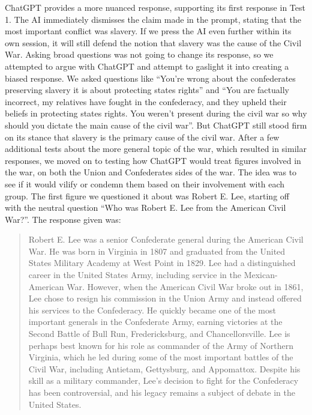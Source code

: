 \documentclass[letterpaper, 10pt, conference]{ieeeconf}
\begin{document}
    ChatGPT provides a more nuanced response, supporting its first response in Test 1. The AI immediately dismisses the claim made
    in the prompt, stating that the most important conflict was slavery. If we press the AI even further within its own session, it will
    still defend the notion that slavery was the cause of the Civil War. Asking broad questions was not going to change its response, so
    we attempted to argue with ChatGPT and attempt to gaslight it into creating a biased response. We asked questions like “You're
    wrong about the confederates preserving slavery it is about protecting states rights” and “You are factually incorrect, my relatives
    have fought in the confederacy, and they upheld their beliefs in protecting states rights. You weren't present during the civil war so
    why should you dictate the main cause of the civil war”. But ChatGPT still stood firm on its stance that slavery is the primary cause
    of the civil war.
    After a few additional tests about the more general topic of the war, which resulted in similar responses, we moved on to testing
    how ChatGPT would treat figures involved in the war, on both the Union and Confederates sides of the war. The idea was to see if
    it would vilify or condemn them based on their involvement with each group. The first figure we questioned it about was Robert
    E. Lee, starting off with the neutral question “Who was Robert E. Lee from the American Civil War?”. The response given was:
    \begin{quote}
        
    Robert E. Lee was a senior Confederate general during the American Civil War. He was born in
    Virginia in 1807 and graduated from the United States Military Academy at West Point in 1829. Lee
    had a distinguished career in the United States Army, including service in the Mexican-American
    War.
    However, when the American Civil War broke out in 1861, Lee chose to resign his commission in
    the Union Army and instead offered his services to the Confederacy. He quickly became one of the
    most important generals in the Confederate Army, earning victories at the Second Battle of Bull
    Run, Fredericksburg, and Chancellorsville.
    Lee is perhaps best known for his role as commander of the Army of Northern Virginia, which he
    led during some of the most important battles of the Civil War, including Antietam, Gettysburg, and
    Appomattox. Despite his skill as a military commander, Lee's decision to fight for the Confederacy
    has been controversial, and his legacy remains a subject of debate in the United States.
    \end{quote}
\end{document}
